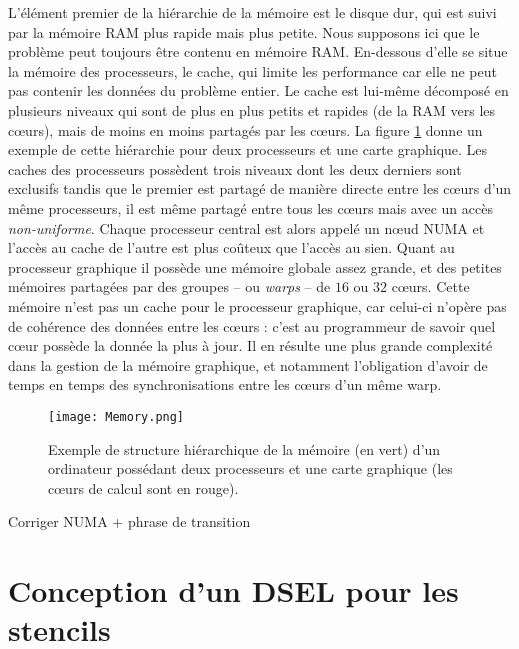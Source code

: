 L'élément premier de la hiérarchie de la mémoire est le disque dur, qui est suivi par la mémoire RAM plus rapide mais plus petite. Nous supposons ici que le problème peut toujours être contenu en mémoire RAM. En-dessous d'elle se situe la mémoire des processeurs, le cache, qui limite les performance car elle ne peut pas contenir les données du problème entier. Le cache est lui-même décomposé en plusieurs niveaux qui sont de plus en plus petits et rapides (de la RAM vers les cœurs), mais de moins en moins partagés par les cœurs. La figure \ref{fig:memoire_base} donne un exemple de cette hiérarchie pour deux processeurs et une carte graphique. Les caches des processeurs possèdent trois niveaux dont les deux derniers sont exclusifs tandis que le premier est partagé de manière directe entre les cœurs d'un même processeurs, il est même partagé entre tous les cœurs mais avec un accès \emph{non-uniforme}. Chaque processeur central est alors appelé un nœud NUMA et l'accès au cache de l'autre est plus coûteux que l'accès au sien. Quant au processeur graphique il possède une mémoire globale assez grande, et des petites mémoires partagées par des groupes -- ou \emph{warps} -- de $16$ ou $32$ cœurs. Cette mémoire n'est pas un cache pour le processeur graphique, car celui-ci n'opère pas de cohérence des données entre les cœurs : c'est au programmeur de savoir quel cœur possède la donnée la plus à jour. Il en résulte une plus grande complexité dans la gestion de la mémoire graphique, et notamment l'obligation d'avoir de temps en temps des synchronisations entre les cœurs d'un même warp. 

\begin{figure}[!h]
  \caption{Exemple de structure hiérarchique de la mémoire (en vert) d'un ordinateur possédant deux processeurs et une carte graphique (les cœurs de calcul sont en rouge).}
  \label{fig:memoire_base}
  \texttt{[image: Memory.png]}
\end{figure}

{\LARGE 
Corriger NUMA + phrase de transition}


\section{Conception d'un DSEL pour les stencils}

